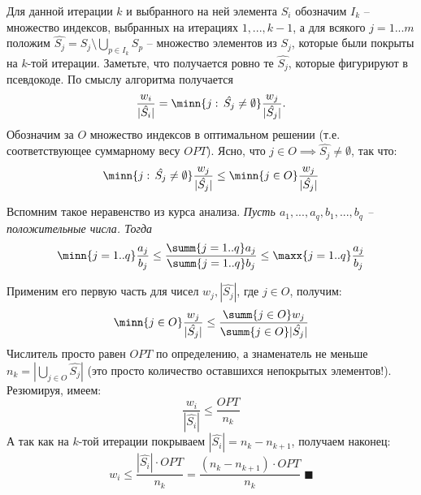 Для данной итерации $k$ и выбранного на ней элемента $S_i$ обозначим $I_k$ -- множество индексов, выбранных на итерациях $1, ..., k-1$, а для всякого $j=1...m$ положим $\hat{S_j} = S_j \setminus \bigcup_{p \in I_k}S_p$ -- множество элементов из $S_j$, которые были покрыты на $k$-той итерации. Заметьте, что получается ровно те $\hat{S_j}$, которые фигурируют в псевдокоде. По смыслу алгоритма получается $$\frac{w_i}{|\hat{S_i}|} = \minn{j:\, \hat{S_j}\neq \emptyset} \frac{w_j}{|\hat{S_j}|}.$$
Обозначим за $O$ множество индексов в оптимальном решении (т.е. соответствующее суммарному весу $OPT$). Ясно, что $j \in O \implies \hat{S_j} \neq \emptyset$, так что: $$\minn{j:\, \hat{S_j}\neq \emptyset} \frac{w_j}{|\hat{S_j}|} \leq \minn{j \in O} \frac{w_j}{|\hat{S_j}|}$$

Вспомним такое неравенство из курса анализа. \textit{Пусть $a_1, ..., a_q, b_1, ..., b_q$ -- положительные числа. Тогда}
$$\minn{j=1..q} \frac{a_j}{b_j} \leq \frac{\summ{j=1..q} a_j}{\summ{j=1..q} b_j} \leq \maxx{j=1..q} \frac{a_j}{b_j}$$

Применим его первую часть для чисел $w_j, |\hat{S_j}|$, где $j \in O$, получим:
$$\minn{j\in O} \frac{w_j}{|\hat{S_j}|} \leq \frac{\summ{j \in O} w_j}{\summ{j \in O} |\hat{S_j}|}$$
Числитель просто равен $OPT$ по определению, а знаменатель не меньше $n_k = |\bigcup_{j \in O} \hat{S_j}|$ (это просто количество оставшихся непокрытых элементов!). Резюмируя, имеем: $$\frac{w_i}{|\hat{S_i}|} \leq \frac{OPT}{n_k}$$
А так как на $k$-той итерации покрываем $|\hat{S_i}| = n_k - n_{k+1}$, получаем наконец:
$$w_i \leq \frac{|\hat{S_i}|\cdot OPT}{n_k} = \frac{(n_k-n_{k+1})\cdot OPT}{n_k}\;\blacksquare$$